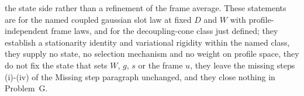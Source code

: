 the state side rather than a refinement of the frame average. These statements are for the named coupled gaussian slot law at fixed \(D\) and \(W\) with profile-independent frame laws, and for the decoupling-cone class just defined; they establish a stationarity identity and variational rigidity within the named class, they supply no state, no selection mechanism and no weight on profile space, they do not fix the state that sets \(W\), \(g\), \(s\) or the frame \(u\), they leave the missing steps (i)-(iv) of the Missing step paragraph unchanged, and they close nothing in Problem~G.
